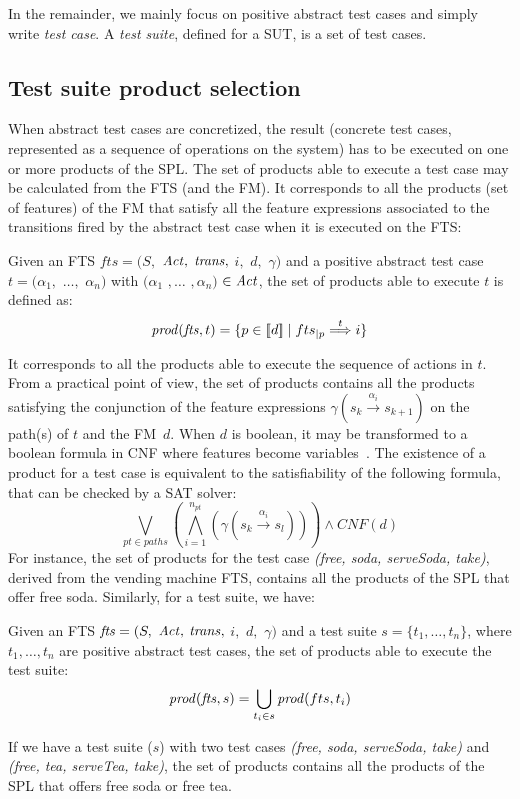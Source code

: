 In the remainder, we mainly focus on positive abstract test cases and simply write \emph{test case}. A \emph{test suite}, defined for a \gls{SUT}, is a set of test cases.


\subsection{Test suite product selection}

When abstract test cases are concretized, the result (\ie concrete test cases, represented as a sequence of operations on the system) has to be executed on one or more products of the SPL. The set of products able to execute a test case may be calculated from the FTS (and the FM). It corresponds to all the products (\ie set of features) of the FM that satisfy all the feature expressions associated to the transitions fired by the abstract test case when it is executed on the FTS:
%
\begin{definition}
Given an FTS $fts = (S,$ $\mathit{Act},$ $\mathit{trans},$ $i,$ $d,$ $\gamma) $ and a positive abstract test case $t = (\alpha_1 ,$ $ \ldots ,$ $ \alpha_n)$ with $(\alpha_1 $ $, \ldots $ $, \alpha_n)$ $ \in \mathit{Act}$, the set of products able to execute $t$ is defined as:
%
$$ \mathit{prod}(\mathit{fts}, t) = \{ p \in [\![ d]\!] \mid fts_{\mid p} \overset{t}{\Longrightarrow} i\}
$$
%
\end{definition}
It corresponds to all the products able to execute the sequence of actions in $t$. 
%
From a practical point of view, the set of products contains all the products satisfying the conjunction of the feature expressions $\gamma (s_k \overset{\alpha_i}{\longrightarrow} s_{k+1}) $ on the path(s) of $t$ and the FM~$d$. When $d$ is boolean, it may be transformed to a boolean formula in \gls{CNF} where features become variables~\cite{Czarnecki2007}. The existence of a product for a test case is equivalent to the satisfiability of the following formula, that can be checked by a SAT solver:
%
$$\bigvee_{\mathit{pt} \in \mathit{paths}} \left(\bigwedge_{i=1}^{n_{\mathit{pt}}} \left( \gamma (s_k \overset{\alpha_i}{\longrightarrow} s_{l}) \right) \right) \wedge \mathit{CNF}(d)$$
%
For instance, the set of products for the test case \textit{(free, soda, serve\-Soda, take)}, derived from the vending machine FTS, contains all the products of the SPL that offer free soda.
%
Similarly, for a test suite, we have:
%
\begin{definition}
Given an FTS $\mathit{fts} = (S,$ $\mathit{Act},$ $\mathit{trans},$ $i,$ $d,$ $\gamma) $ and a test suite $s=\{t_1 , \ldots , t_n \}$, where $t_1, \ldots, t_n$ are positive abstract test cases, the set of products able to execute the test suite:
$$\mathit{prod}(\mathit{fts}, s) = \bigcup_{t_i \in s} \mathit{prod}(fts, t_i)$$
\end{definition}
If we have a test suite ($s$) with two test cases \textit{(free, soda, serve\-Soda, take)} and \textit{(free, tea, serve\-Tea, take)}, the set of products contains all the products of the SPL that offers free soda or free tea.

